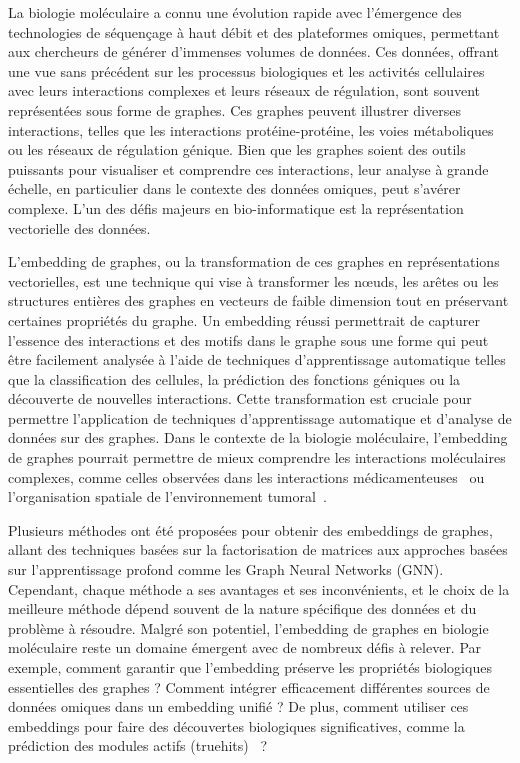 La biologie moléculaire a connu une évolution rapide avec l'émergence des technologies de séquençage à haut débit et des plateformes omiques, permettant aux chercheurs de générer d'immenses volumes de données. Ces données, offrant une vue sans précédent sur les processus biologiques et les activités cellulaires avec leurs interactions complexes et leurs réseaux de régulation, sont souvent représentées sous forme de graphes. Ces graphes peuvent illustrer diverses interactions, telles que les interactions protéine-protéine, les voies métaboliques ou les réseaux de régulation génique. Bien que les graphes soient des outils puissants pour visualiser et comprendre ces interactions, leur analyse à grande échelle, en particulier dans le contexte des données omiques, peut s'avérer complexe. L'un des défis majeurs en bio-informatique est la représentation vectorielle des données.

L'embedding de graphes, ou la transformation de ces graphes en représentations vectorielles, est une technique qui vise à transformer les nœuds, les arêtes ou les structures entières des graphes en vecteurs de faible dimension tout en préservant certaines propriétés du graphe. Un embedding réussi permettrait de capturer l'essence des interactions et des motifs dans le graphe sous une forme qui peut être facilement analysée à l'aide de techniques d'apprentissage automatique telles que la classification des cellules, la prédiction des fonctions géniques ou la découverte de nouvelles interactions. Cette transformation est cruciale pour permettre l'application de techniques d'apprentissage automatique et d'analyse de données sur des graphes. Dans le contexte de la biologie moléculaire, l'embedding de graphes pourrait permettre de mieux comprendre les interactions moléculaires complexes, comme celles observées dans les interactions médicamenteuses~\cite{sadeghi2022} ou l'organisation spatiale de l'environnement tumoral~\cite{ding2021}.

Plusieurs méthodes ont été proposées pour obtenir des embeddings de graphes, allant des techniques basées sur la factorisation de matrices aux approches basées sur l'apprentissage profond comme les Graph Neural Networks (GNN). Cependant, chaque méthode a ses avantages et ses inconvénients, et le choix de la meilleure méthode dépend souvent de la nature spécifique des données et du problème à résoudre. Malgré son potentiel, l'embedding de graphes en biologie moléculaire reste un domaine émergent avec de nombreux défis à relever. Par exemple, comment garantir que l'embedding préserve les propriétés biologiques essentielles des graphes ? Comment intégrer efficacement différentes sources de données omiques dans un embedding unifié ? De plus, comment utiliser ces embeddings pour faire des découvertes biologiques significatives, comme la prédiction des modules actifs (truehits)~\cite{ashoor2020} ?

